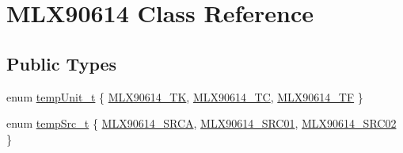 \hypertarget{class_m_l_x90614}{\section{M\-L\-X90614 Class Reference}
\label{class_m_l_x90614}
}
\subsection*{Public Types}
\begin{DoxyCompactItemize}
\item 
enum \hyperlink{class_m_l_x90614_a18769519e647d93c959566b81d2e514f}{temp\-Unit\-\_\-t} \{ \hyperlink{class_m_l_x90614_a18769519e647d93c959566b81d2e514fa074167c1192349236b451ecd3d7e5582}{M\-L\-X90614\-\_\-\-T\-K}, 
\hyperlink{class_m_l_x90614_a18769519e647d93c959566b81d2e514fa75d66a29cab65ff4514b5cd6a268c7bf}{M\-L\-X90614\-\_\-\-T\-C}, 
\hyperlink{class_m_l_x90614_a18769519e647d93c959566b81d2e514fa34f399de3c986d3eede0268f6a34a96b}{M\-L\-X90614\-\_\-\-T\-F}
 \}
\item 
enum \hyperlink{class_m_l_x90614_a500f8c49b00e725d5c201092d9c02b8b}{temp\-Src\-\_\-t} \{ \hyperlink{class_m_l_x90614_a500f8c49b00e725d5c201092d9c02b8ba8e4a1c077fba74d29d5c7065ed9cc382}{M\-L\-X90614\-\_\-\-S\-R\-C\-A}, 
\hyperlink{class_m_l_x90614_a500f8c49b00e725d5c201092d9c02b8ba91f620721ea47dec379db791d735a55b}{M\-L\-X90614\-\_\-\-S\-R\-C01}, 
\hyperlink{class_m_l_x90614_a500f8c49b00e725d5c201092d9c02b8baa8763ed94d24c7d2a45fcec6d7183643}{M\-L\-X90614\-\_\-\-S\-R\-C02}
 \}
\end{DoxyCompactItemize}
